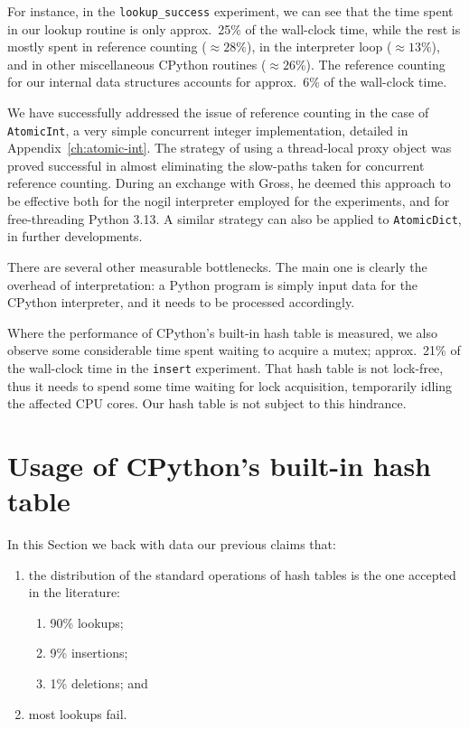 For instance, in the \texttt{lookup\_success} experiment, we can see that the time spent in our lookup routine is only approx.\ 25\% of the wall-clock time, while the rest is mostly spent in reference counting ($\approx28\%$), in the interpreter loop ($\approx13\%$), and in other miscellaneous CPython routines ($\approx26\%$).
The reference counting for our internal data structures accounts for approx.\ 6\% of the wall-clock time.

We have successfully addressed the issue of reference counting in the case of \texttt{AtomicInt}, a very simple concurrent integer implementation, detailed in Appendix~\ref{ch:atomic-int}.
The strategy of using a thread-local proxy object was proved successful in almost eliminating the slow-paths taken for concurrent reference counting.
During an exchange with Gross, he deemed this approach to be effective both for the nogil interpreter employed for the experiments, and for free-threading Python 3.13.
A similar strategy can also be applied to \texttt{AtomicDict}, in further developments.

There are several other measurable bottlenecks.
The main one is clearly the overhead of interpretation: a Python program is simply input data for the CPython interpreter, and it needs to be processed accordingly.

Where the performance of CPython's built-in hash table is measured, we also observe some considerable time spent waiting to acquire a mutex; approx.\ 21\% of the wall-clock time in the \texttt{insert} experiment.
That hash table is not lock-free, thus it needs to spend some time waiting for lock acquisition, temporarily idling the affected CPU cores.
Our hash table is not subject to this hindrance.


\section{Usage of CPython's built-in hash table}\label{sec:dict-metrics}

In this Section we back with data our previous claims that:
\begin{enumerate}
    \item the distribution of the standard operations of hash tables is the one accepted in the literature:
    \begin{enumerate}
        \item 90\% lookups;
        \item 9\% insertions;
        \item 1\% deletions; and
    \end{enumerate}
    \item most lookups fail.
\end{enumerate}

